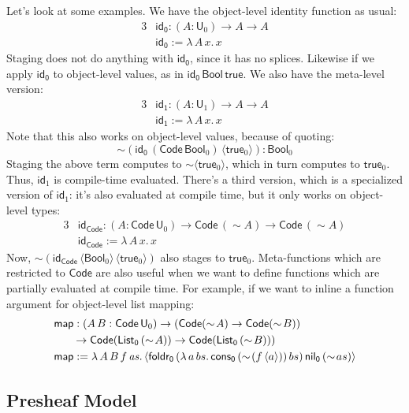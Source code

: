 \documentclass[11pt,a4paper,twoside]{article}
\newcommand{\msf}[1]{\mathsf{#1}}
\newcommand{\mi}[1]{\mathit{#1}}
\newcommand{\U}{\mathsf{U}}
\newcommand{\Code}{\mathsf{Code}}
\newcommand{\Bool}{\msf{Bool}}
\newcommand{\true}{\msf{true}}
\newcommand{\id}{\msf{id}}
\newcommand{\qtm}[1]{\langle #1\rangle}
\begin{document}
Let's look at some examples. We have the object-level identity function as usual:
\begin{alignat*}{3}
  &\msf{id_0} : (A : \U_0) \to A \to A\\
  &\msf{id_0} := \lambda\,A\,x.\,x
\end{alignat*}
Staging does not do anything with $\msf{id_0}$, since it has no
splices. Likewise if we apply $\msf{id_0}$ to object-level values, as in $\msf{id_0}\,\Bool\,\msf{true}$. We also have the meta-level version:
\begin{alignat*}{3}
  &\msf{id_1} : (A : \U_1) \to A \to A\\
  &\msf{id_1} := \lambda\,A\,x.\,x
\end{alignat*}
Note that this also works on object-level values, because of quoting:
\[
   \sim\!(\msf{id_0}\,(\Code\,\Bool_0)\,\qtm{\true_0}) : \Bool_0
\]
Staging the above term computes to $\sim\!\qtm{\true_0}$, which in turn
computes to $\true_0$. Thus, $\id_1$ is compile-time evaluated. There's a third
version, which is a specialized version of $\id_1$: it's also evaluated at compile time,
but it only works on object-level types:
\begin{alignat*}{3}
  &\msf{id_{Code}} : (A : \Code\,\U_0) \to \Code\,(\sim\!A) \to \Code\,(\sim\!A)\\
  &\msf{id_{Code}} := \lambda\,A\,x.\,x
\end{alignat*}
Now, $\sim\!(\id_{\Code}\,\qtm{\Bool_0}\,\qtm{\true_0})$ also stages to
$\true_0$. Meta-functions which are restricted to $\Code$ are also useful when
we want to define functions which are partially evaluated at compile time. For
example, if we want to inline a function argument for object-level list mapping:
\begin{alignat*}{3}
  &\rlap{$\msf{map} : (A\,B : \Code\,\U_0) \to (\Code(\sim\!A) \to \Code(\sim\!B))$}\\
  &\hspace{2em}\rlap{$\to \Code(\msf{List_0}\,(\sim\!A)) \to \Code(\msf{List_0}\,(\sim\!B)))$}\\
  &\msf{map} := \lambda\,A\,B\,f\,\mi{as}.\,\qtm{\msf{foldr_0}\,
    (\lambda\,a\,bs.\,\msf{cons_0}\,(\sim\!(f\,\qtm{a}))\,bs)\,\msf{nil_0}\,(\sim\!as)}
\end{alignat*}

\subsection*{Presheaf Model}
\end{document}
